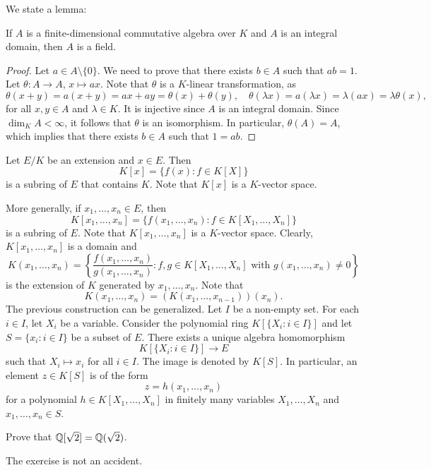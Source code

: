 We state a lemma:

\begin{lemma}
If $A$ is a finite-dimensional commutative algebra over $K$ 
and $A$ is an integral domain, then $A$ is a field. 
\end{lemma}

\begin{proof}
	Let $a\in A\setminus\{0\}$. We need to prove that there exists $b\in A$
	such that $ab=1$. Let $\theta\colon A\to A$, $x\mapsto ax$. Note that 
	$\theta$ is a $K$-linear transformation, as 
    \[
    \theta(x+y)=a(x+y)=ax+ay=\theta(x)+\theta(y),\quad
    \theta(\lambda x)=a(\lambda x)=\lambda (ax)=\lambda\theta(x),
    \]
    for all $x,y\in A$ and $\lambda\in K$. 
 It is injective since $A$ is an
	integral domain.  Since $\dim_KA<\infty$, it follows that $\theta$ is an
	isomorphism. In particular, $\theta(A)=A$, which implies that there exists
	$b\in A$ such that $1=ab$. 
\end{proof}

Let $E/K$ be an extension and $x\in E$. 
Then 
\[
K[x]=\{f(x): f\in K[X]\}
\]
is a subring of $E$ that contains $K$. Note that 
$K[x]$ is a $K$-vector space. 

More generally,
if $x_1,\dots,x_n\in E$, then
\[
K[x_1,\dots,x_n]=\{f(x_1,\dots,x_n):f\in K[X_1,\dots,X_n]\}
\]
is a subring of $E$. 
Note that $K[x_1,\dots,x_n]$ is a $K$-vector space. 
Clearly, $K[x_1,\dots,x_n]$ is a domain
and 
\[
K(x_1,\dots,x_n)=\left\{\frac{f(x_1,\dots,x_n)}{g(x_1,\dots,x_n)}:f,g\in K[X_1,\dots,X_n]\text{ with $g(x_1,\dots,x_n)\ne 0$}\right\}
\]
is the extension of $K$ generated by $x_1,\dots,x_n$. 
Note that 
\[
K(x_1,\dots,x_n)=(K(x_1,\dots,x_{n-1}))(x_n).
\]
The previous construction
can be generalized. Let $I$ be a non-empty set. 
For each $i\in I$, let $X_i$ be a variable. Consider
the polynomial ring $K[\{X_i:i\in I\}]$ and let 
$S=\{x_i:i\in I\}$ be a subset of $E$. There exists a unique 
algebra homomorphism 
\[
K[\{X_i:i\in I\}]\to E
\]
such that $X_i\mapsto x_i$ for all $i\in I$. The image 
is denoted by $K[S]$. In particular, an element $z\in K[S]$ 
is of the form 
\[
z=h(x_1,\dots,x_n)
\]
for a polynomial $h\in K[X_1,\dots,X_n]$ 
in finitely many variables $X_1,\dots,X_n$ and 
$x_1,\dots,x_n\in S$. 

\begin{exercise}
\label{xca: Q[sqrt2]=Q(sqrt2)}
    Prove that $\mathbb{Q}[\sqrt{2}]=\mathbb{Q}(\sqrt{2})$. 
\end{exercise}

The exercise is not an accident. 

